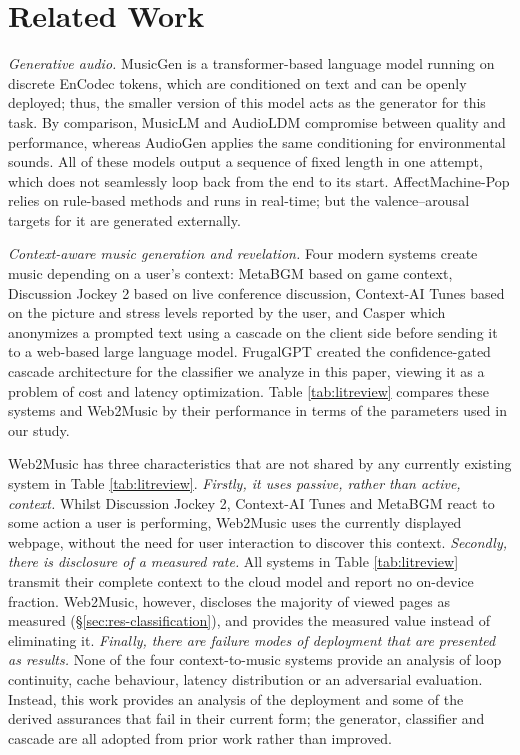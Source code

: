\documentclass[conference]{IEEEtran}
\begin{document}
\section{Related Work}
\label{sec:related}
\label{sec:recent-systems}

\emph{Generative audio.} MusicGen \cite{musicgen} is a transformer-based
language model running on discrete EnCodec \cite{encodec} tokens, which are
conditioned on text and can be openly deployed; thus, the smaller version of
this model acts as the generator for this task. By comparison, MusicLM
\cite{musiclm} and AudioLDM \cite{audioldm} compromise between quality and
performance, whereas AudioGen \cite{audiogen} applies the same conditioning
for environmental sounds. All of these models output a sequence of fixed
length in one attempt, which does not seamlessly loop back from the end to its
start. AffectMachine-Pop \cite{affectmachine} relies on rule-based methods and
runs in real-time; but the valence--arousal targets \cite{russell} for it are
generated externally.

\emph{Context-aware music generation and revelation.} Four modern systems
create music depending on a user's context: MetaBGM \cite{metabgm} based on
game context, Discussion Jockey 2 \cite{discussionjockey} based on live
conference discussion, Context-AI Tunes \cite{contextaitunes} based on the
picture and stress levels reported by the user, and Casper \cite{casper} which
anonymizes a prompted text using a cascade on the client side before sending
it to a web-based large language model. FrugalGPT \cite{frugalgpt} created the
confidence-gated cascade architecture for the classifier we analyze in this
paper, viewing it as a problem of cost and latency optimization. Table
\ref{tab:litreview} compares these systems and Web2Music by their performance
in terms of the parameters used in our study.

Web2Music has three characteristics that are not shared by any currently
existing system in Table \ref{tab:litreview}. \emph{Firstly, it uses passive,
rather than active, context.} Whilst Discussion Jockey 2, Context-AI Tunes and
MetaBGM react to some action a user is performing, Web2Music uses the
currently displayed webpage, without the need for user interaction to discover
this context. \emph{Secondly, there is disclosure of a measured rate.} All
systems in Table \ref{tab:litreview} transmit their complete context to the
cloud model and report no on-device fraction. Web2Music, however, discloses
the majority of viewed pages as measured (\S\ref{sec:res-classification}), and
provides the measured value instead of eliminating it. \emph{Finally, there
are failure modes of deployment that are presented as results.} None of the
four context-to-music systems provide an analysis of loop continuity, cache
behaviour, latency distribution or an adversarial evaluation. Instead, this
work provides an analysis of the deployment and some of the derived assurances
that fail in their current form; the generator, classifier and cascade are all
adopted from prior work rather than improved.
\end{document}

